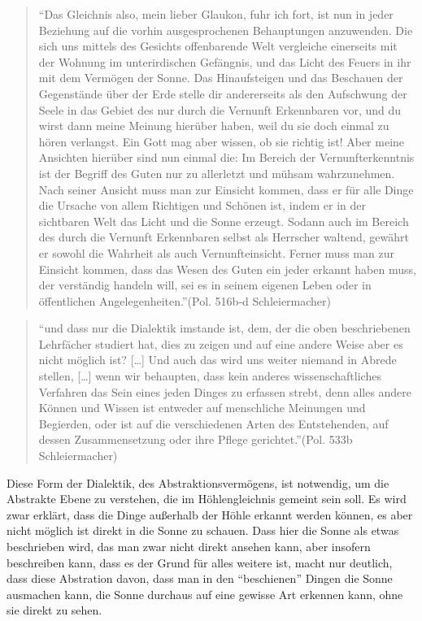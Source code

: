 \documentclass[12pt]{article}
\newcommand*{\zitatblock}[1]{%
    \begin{quote}
    \fontsize{10}{12}\selectfont
    \setlength{\parskip}{1.0em}
    #1
    \end{quote}
}
\begin{document}
\zitatblock{\enquote{Das Gleichnis also, mein lieber Glaukon, fuhr ich fort, ist nun in jeder Beziehung auf die vorhin ausgesprochenen Behauptungen anzuwenden. Die sich uns mittels des Gesichts offenbarende Welt vergleiche einerseits mit der Wohnung im unterirdischen Gefängnis, und das Licht des Feuers in ihr mit dem Vermögen der Sonne. Das Hinaufsteigen und das Beschauen der Gegenstände über der Erde stelle dir andererseits als den Aufschwung der Seele in das Gebiet des nur durch die Vernunft Erkennbaren vor, und du wirst dann meine Meinung hierüber haben, weil du sie doch einmal zu hören verlangst. Ein Gott mag aber wissen, ob sie richtig ist! Aber meine Ansichten hierüber sind nun einmal die: Im Bereich der Vernunfterkenntnis ist der Begriff des Guten nur zu allerletzt und mühsam wahrzunehmen. Nach seiner Ansicht muss man zur Einsicht kommen, dass er für alle Dinge die Ursache von allem Richtigen und Schönen ist, indem er in der sichtbaren Welt das Licht und die Sonne erzeugt. Sodann auch im Bereich des durch die Vernunft Erkennbaren selbst als Herrscher waltend, gewährt er sowohl die Wahrheit als auch Vernunfteinsicht. Ferner muss man zur Einsicht kommen, dass das Wesen des Guten ein jeder erkannt haben muss, der verständig handeln will, sei es in seinem eigenen Leben oder in öffentlichen Angelegenheiten.}(Pol. 516b-d Schleiermacher)}
\zitatblock{\enquote{und dass nur die Dialektik imstande ist, dem, der die oben beschriebenen Lehrfächer studiert hat, dies zu zeigen und auf eine andere Weise aber es nicht möglich ist? [\dots] Und auch das wird uns weiter niemand in Abrede stellen, [\dots] wenn wir behaupten, dass kein anderes wissenschaftliches Verfahren das Sein eines jeden Dinges zu erfassen strebt, denn alles andere Können und Wissen ist entweder auf menschliche Meinungen und Begierden, oder ist auf die verschiedenen Arten des Entstehenden, auf dessen Zusammensetzung oder ihre Pflege gerichtet.}(Pol. 533b Schleiermacher)}
Diese Form der Dialektik, des Abstraktionsvermögens, ist notwendig, um die Abstrakte Ebene zu verstehen, die im Höhlengleichnis gemeint sein soll. Es wird zwar erklärt, dass die Dinge außerhalb der Höhle erkannt werden können, es aber nicht möglich ist direkt in die Sonne zu schauen. Dass hier die Sonne als etwas beschrieben wird, das man zwar nicht direkt ansehen kann, aber insofern beschreiben kann, dass es der Grund für alles weitere ist, macht nur deutlich, dass diese Abstration davon, dass man in den \enquote{beschienen} Dingen die Sonne ausmachen kann, die Sonne durchaus auf eine gewisse Art erkennen kann, ohne sie direkt zu sehen.
\end{document}
